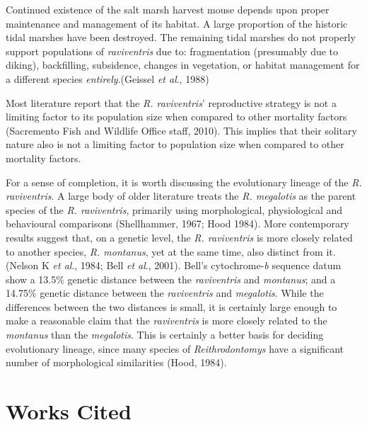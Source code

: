 \documentclass[a4paper]{article}
\begin{document}
Continued existence of the salt marsh harvest mouse depends upon proper maintenance and management of its habitat. A large proportion of the historic tidal marshes have been destroyed. The remaining tidal marshes do not properly support populations of \textit{raviventris} due to: fragmentation (presumably due to diking), backfilling, subsidence, changes in vegetation, or habitat management for a different species \textit{entirely}.(Geissel \textit{et al}., 1988)

Most literature report that the \textit{R. raviventris}' reproductive strategy is not a limiting factor to its population size when compared to other mortality factors (Sacremento Fish and Wildlife Office staff, 2010). This implies that their solitary nature also is not a limiting factor to population size when compared to other mortality factors.

For a sense of completion, it is worth discussing the evolutionary lineage of the \textit{R. raviventris}. A large body of older literature treats the \textit{R. megalotis} as the parent species of the \textit{R. raviventris}, primarily using morphological, physiological and behavioural comparisons (Shellhammer, 1967; Hood 1984). More contemporary results suggest that, on a genetic level, the \textit{R. raviventris} is more closely related to another species, \textit{R. montanus}, yet at the same time, also distinct from it. (Nelson K \textit{et al}., 1984; Bell \textit{et al}., 2001). Bell's cytochrome-\textit{b} sequence datum show a 13.5\% genetic distance between the \textit{raviventris} and \textit{montanus}; and a 14.75\% genetic distance between the \textit{raviventris} and \textit{megalotis}. While the differences between the two distances is small, it is certainly large enough to make a reasonable claim that the \textit{raviventris} is more closely related to the \textit{montanus} than the \textit{megalotis}. This is certainly a better basis for deciding evolutionary lineage, since many species of \textit{Reithrodontomys} have a significant number of morphological similarities (Hood, 1984).
\section{Works Cited}
\end{document}

